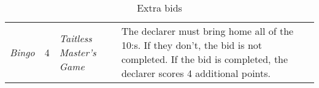 \begin{table}
\begin{center}
{\begin{tabularx}{\textwidth}{ lcX | p{6cm} }
					\textit{Bingo} & 4 &
					\textit{Taitless Master's Game} &
					The declarer must bring home all of the 10:s. If they don't, the bid is not completed. If the bid is completed, the declarer scores 4 additional points.
					
			\end{tabularx}
		}
	\end{center}
	\caption{Extra bids}
	\label{tab:extraBids}
\end{table}
